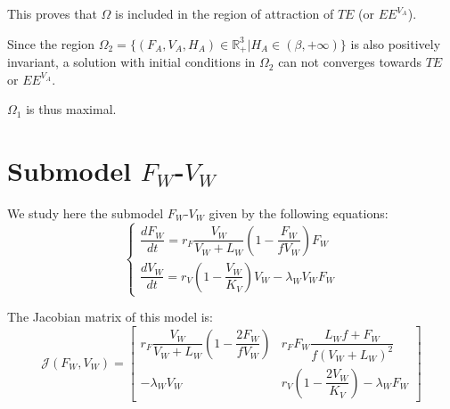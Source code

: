 \documentclass{article}
\newcommand{\lfv}{\lambda_{W}}
\begin{document}
This proves that $\Omega$ is included in the region of attraction of $TE$ (or $EE^{V_A}$).


Since the region $\Omega_2 = \{(F_{A}, V_{A}, H_{A}) \in \mathbb{R}_+^3 | H_{A} \in (\beta, +\infty) \}$ is also positively invariant, a solution with initial conditions in $\Omega_2$ can not converges towards $TE$ or $EE^{V_A}$.

$\Omega_1$ is thus maximal.


\newpage 
\section{Submodel $F_W$-$V_W$}

We study here the submodel $F_W$-$V_W$ given by the following equations:
\begin{equation}
\left\lbrace \begin{array}{l}
\dfrac{dF_W}{dt} = r_F \dfrac{V_W}{V_W + L_W} \left(1 - \dfrac{F_W}{f V_W}\right) F_W \\
\dfrac{dV_W}{dt} = r_V \left(1 - \dfrac{V_W}{K_V}\right) V_W - \lfv V_W F_W
\end{array} \right.
\label{modelFWVW}
\end{equation}

The Jacobian matrix of this model is:
\begin{equation*}
\mathcal{J}(F_W, V_W) = \begin{bmatrix}
r_F \dfrac{V_W}{V_W + L_W} \left(1 - \dfrac{2F_W}{fV_W}\right) & r_F F_W \dfrac{L_W f + F_W}{f (V_W + L_W)^2} \\
-\lfv V_W & r_V \left(1 - \dfrac{2V_W}{K_V}\right) - \lfv F_W
\end{bmatrix}
\end{equation*}
\end{document}
